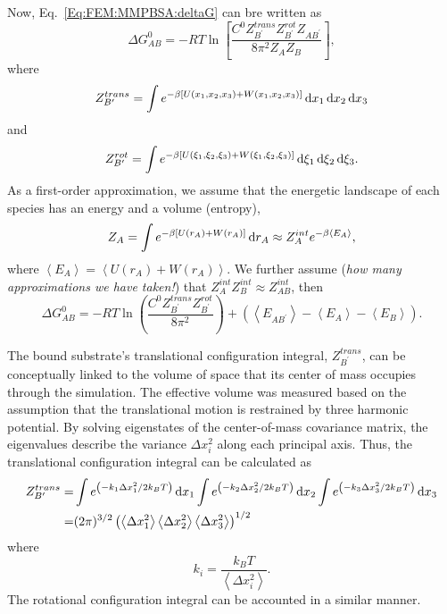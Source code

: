 Now, Eq.~\ref{Eq:FEM:MMPBSA:deltaG} can bre written as
\begin{equation}
   \Delta G_{AB}^0=-RT\ln{\left[\frac{C^0Z_{B^\prime}^{trans}Z_{B^\prime}^{rot}Z_{AB^\prime}}{8\pi^2Z_AZ_B}\right]},
\end{equation}
where
\begin{equation}
   Z_{B^\prime}^{trans}=\int e^{-\beta\left[U(x_1,x_2,x_3)+W(x_1,x_2,x_3)\right]}\mathop{}\!\mathrm{d} x_1\mathop{}\!\mathrm{d} x_2\mathop{}\!\mathrm{d} x_3
\end{equation}
and
\begin{equation}
	Z_{B^\prime}^{rot}=\int e^{-\beta\left[U(\xi_1,\xi_2,\xi_3)+W(\xi_1,\xi_2,\xi_3)\right]}\mathop{}\!\mathrm{d}\xi_1\mathop{}\!\mathrm{d}\xi_2\mathop{}\!\mathrm{d}\xi_3.
\end{equation}
As a first-order approximation, we assume that the energetic landscape of each species has an energy and a volume (entropy),
\begin{equation}
	Z_A=\int e^{-\beta \left[U(r_A)+W(r_A)\right]}\mathop{}\!\mathrm{d} r_A\approx Z_A^{int}e^{-\beta \left<E_A\right>},
\end{equation}
where $\left<E_A\right>=\left<U(r_A)+W(r_A)\right>$. We further assume (\textit{how many approximations we have taken!}) that $Z_A^{int}Z_B^{int}\approx Z_{AB}^{int}$,
then
\begin{equation}
	\Delta G_{AB}^0=-RT\ln{\left(\frac{C^0Z_{B^\prime}^{trans}Z_{B^\prime}^{rot}}{8\pi^2}\right)} +\left(\left<E_{AB^\prime}\right>-\left<E_A\right>-\left<E_B\right>\right).
\end{equation}
 
The bound substrate's translational configuration integral, $Z_{B^\prime}^{trans}$, can be conceptually linked to the volume of space that its center of mass occupies through the simulation. The effective volume was measured based on the assumption that the translational motion is restrained by three harmonic potential. By solving eigenstates of the center-of-mass covariance matrix, the eigenvalues describe the variance $\Delta x_i^2$ along each principal axis. Thus, the translational configuration integral can be calculated as
\begin{align}
Z_{B^\prime}^{trans}=&\int e^{\left(-k_1\Delta x_1^2/2k_BT\right)}\mathop{}\!\mathrm{d} x_1\int e^{\left(-k_2\Delta x_2^2/2k_BT\right)}\mathop{}\!\mathrm{d} x_2\int e^{\left(-k_3\Delta x_3^2/2k_BT\right)}\mathop{}\!\mathrm{d} x_3\notag\\
                    =&(2\pi)^{3/2}\left(\left<\Delta x_1^2\right>\left<\Delta x_2^2\right>\left<\Delta x_3^2\right>\right)^{1/2}
\end{align}
where
\begin{equation}
k_i=\frac{k_B T}{\left<\Delta x_i^2\right>}.
\end{equation}
The rotational configuration integral can be accounted in a similar manner.